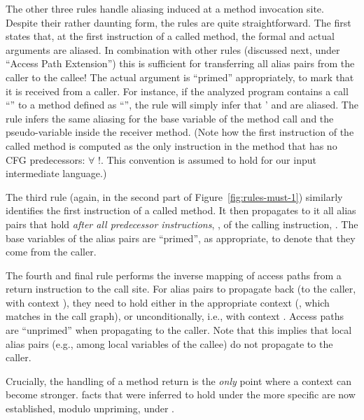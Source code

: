 The other three rules handle aliasing induced at a method invocation
site.  Despite their rather daunting form, the rules are quite
straightforward. The first states that, at the first instruction of a
called method, the formal and actual arguments are aliased. In
combination with other rules (discussed next, under ``Access Path
Extension'') this is sufficient for transferring all alias pairs from
the caller to the callee!  The actual argument is ``primed''
appropriately, to mark that it is received from a caller. For
instance, if the analyzed program contains a call ``'' to a
method defined as ``'', the rule will simply
infer that ' and  are aliased.  The rule infers the same
aliasing for the base variable of the method call and the
pseudo-variable  inside the receiver method. (Note how the
first instruction of the called method is computed as the only
instruction in the method that has no CFG predecessors:
$\forall$  !.  This
convention is assumed to hold for our input intermediate language.)

The third rule (again, in the second part of Figure~\ref{fig:rules-must-1})
similarly identifies the first instruction of a called method. It then
propagates to it all alias pairs that hold \emph{after all predecessor
instructions}, , of the calling instruction, . The base
variables of the alias pairs are ``primed'', as appropriate, to denote that
they come from the caller.

The fourth and final rule performs the inverse mapping of access paths from a
return instruction to the call site. For alias pairs to propagate back (to the
caller, with context ), they need to hold either in the appropriate
context (, which matches  in the call graph), or
unconditionally, i.e., with context . Access paths are
``unprimed'' when propagating to the caller. Note that this implies that local
alias pairs (e.g., among local variables of the callee) do not propagate to the
caller.

Crucially, the handling of a method return is the \emph{only} point where a context can
become stronger.  facts that were inferred to hold under
the more specific  are now established, modulo unpriming, under
.

